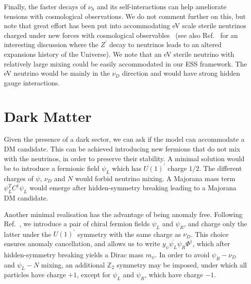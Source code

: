 Finally, the faster decays of $\nu_h$ and its self-interactions can help ameliorate tensions with cosmological observations. We do not comment further on this, but note that great effort has been put into accommodating eV scale sterile neutrinos charged under new forces with cosmological observables~\cite{Hannestad:2013ana,Dasgupta:2013zpn,Mirizzi:2014ama,Chu:2015ipa,Cherry:2016jol,Chu:2018gxk,Song:2018zyl} (see also Ref.~\cite{Escudero:2019gzq} for an interesting discussion where the $Z^\prime$ decay to neutrinos leads to an altered expansions history of the Universe). We note that an eV sterile neutrino with relatively large mixing could be easily accommodated in our ESS framework. The eV neutrino would be mainly in the $\nu_D$ direction and would have strong hidden gauge interactions.

\section{Dark Matter} 
Given the presence of a dark sector, we can ask if the model can accommodate a DM candidate. This can be achieved introducing new fermions that do not mix with the neutrinos, in order to preserve their stability. A minimal solution would be to introduce a fermionic field $\psi_L$ which has $U(1)^\prime$ charge $1/2$. The different charges of $\psi$, $\nu_D$ and $N$ would forbid neutrino mixing. A Majorana mass term $\psi_L^T C^\dagger \psi_L$ would emerge after hidden-symmetry breaking leading to a Majorana DM candidate. 

Another minimal realisation has the advantage of being anomaly free. Following Ref.~\cite{Blennow:2019fhy}, we introduce a pair of chiral fermion fields $\psi_L$ and $\psi_R$, and charge only the latter under the $U(1)^\prime$ symmetry with the same charge as $\nu_D$. This choice ensures anomaly cancellation, and allows us to write $y_{\psi} \overline{\psi_L} \psi_R \Phi^\dagger$, which after hidden-symmetry breaking yields a Dirac mass $m_\psi$. In order to avoid $\psi_R-\nu_D$ and $\psi_L-N$ mixing, an additional $\mathbb{Z}_2$ symmetry may be imposed, under which all particles have charge $+1$, except for $\psi_L$ and $\psi_R$, which have charge $-1$.

